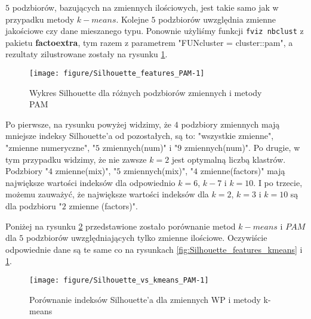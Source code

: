 \documentclass[12pt, a4paper]{article}\usepackage[]{graphicx}\usepackage[]{xcolor}
\makeatletter
\def\maxwidth{ %
  \ifdim\Gin@nat@width>\linewidth
    \linewidth
  \else
    \Gin@nat@width
  \fi
}
\newenvironment{knitrout}{}{} %
\makeatother
\begin{document}
$5$ podzbiorów, bazujących na zmiennych ilościowych, jest takie samo jak w przypadku metody $k-means$. Kolejne $5$ podzbiorów uwzględnia zmienne jakościowe czy dane mieszanego typu. Ponownie użyliśmy funkcji \texttt{fviz nbclust} \cite{nbclust} z pakietu \textbf{factoextra}, tym razem z parametrem "FUNcluster = cluster::pam", a rezultaty zilustrowane zostały na rysunku \ref{fig:Silhouette_features_PAM}.

\begin{knitrout}
\color{fgcolor}\begin{figure}[H]

{\centering \texttt{[image: figure/Silhouette\_features\_PAM-1]} 

}

\caption[Wykres Silhouette dla różnych podzbiorów zmiennych i metody PAM]{Wykres Silhouette dla różnych podzbiorów zmiennych i metody PAM}\label{fig:Silhouette_features_PAM}
\end{figure}

\end{knitrout}

Po pierwsze, na rysunku powyżej widzimy, że $4$ podzbiory zmiennych mają mniejsze indeksy Silhouette'a od pozostałych, są to: "wszystkie zmienne", "zmienne numeryczne", "$5$ zmiennych(num)" i "$9$ zmiennych(num)". Po drugie, w tym przypadku widzimy, że nie zawsze $k=2$ jest optymalną liczbą klastrów. Podzbiory "$4$ zmienne(mix)", "$5$ zmiennych(mix)", "$4$ zmienne(factors)" mają największe wartości indeksów dla odpowiednio $k=6$, $k-7$ i $k=10$. I po trzecie, możemu zauważyć, że największe wartości indeksów dla $k=2$, $k=3$ i $k=10$ są dla podzbioru "$2$ zmienne (factors)".

\par 
Poniżej na rysunku \ref{fig:Silhouette_vs_kmeans_PAM} przedstawione zostało porównanie metod $k-means$ i $PAM$ dla $5$ podzbiorów uwzględniających tylko zmienne ilościowe. Oczywiście odpowiednie dane są te same co na rysunkach \ref{fig:Silhouette_features_kmeans} i \ref{fig:Silhouette_features_PAM}.


\begin{knitrout}
\color{fgcolor}\begin{figure}[H]

{\centering \texttt{[image: figure/Silhouette\_vs\_kmeans\_PAM-1]} 

}

\caption[Porównanie indeksów Silhouette'a dla zmiennych WP i metody k-means]{Porównanie indeksów Silhouette'a dla zmiennych WP i metody k-means}\label{fig:Silhouette_vs_kmeans_PAM}
\end{figure}

\end{knitrout}
\end{document}
